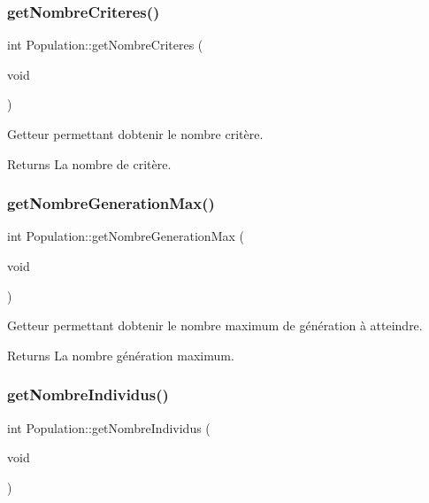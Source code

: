 \subsubsection{\texorpdfstring{get\+Nombre\+Criteres()}{getNombreCriteres()}}
{\footnotesize\ttfamily int Population\+::get\+Nombre\+Criteres (\begin{DoxyParamCaption}\item[{void}]{ }\end{DoxyParamCaption})}



Getteur permettant d\textquotesingle{}obtenir le nombre critère. 

\begin{DoxyReturn}{Returns}
La nombre de critère. 
\end{DoxyReturn}
\mbox{\label{class_population_aa07616afcf9ba7435e6648925a9dd73a}} 
\subsubsection{\texorpdfstring{get\+Nombre\+Generation\+Max()}{getNombreGenerationMax()}}
{\footnotesize\ttfamily int Population\+::get\+Nombre\+Generation\+Max (\begin{DoxyParamCaption}\item[{void}]{ }\end{DoxyParamCaption})}



Getteur permettant d\textquotesingle{}obtenir le nombre maximum de génération à atteindre. 

\begin{DoxyReturn}{Returns}
La nombre génération maximum. 
\end{DoxyReturn}
\mbox{\label{class_population_ad6af7c30607b65d2b7f8d4750443bc0b}} 
\subsubsection{\texorpdfstring{get\+Nombre\+Individus()}{getNombreIndividus()}}
{\footnotesize\ttfamily int Population\+::get\+Nombre\+Individus (\begin{DoxyParamCaption}\item[{void}]{ }\end{DoxyParamCaption})}



